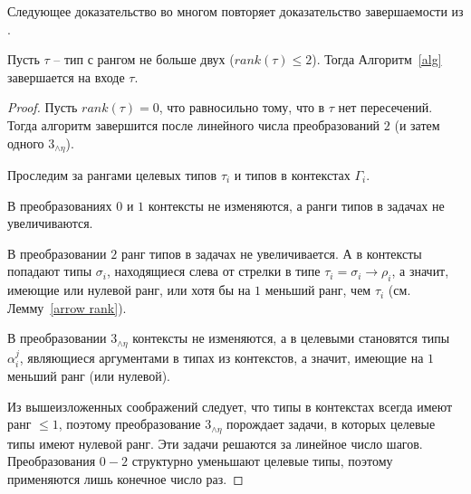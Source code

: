 \documentclass[../main.tex]{subfiles}
\begin{document}
Следующее доказательство во многом повторяет доказательство завершаемости из \cite{kusmierek_07}.
\begin{theorem}[Termination]
Пусть $\tau$ -- тип с рангом не больше двух ($rank(\tau) \leqslant 2$). Тогда Алгоритм~\ref{alg} завершается на входе $\tau$.
\end{theorem}
\begin{proof}
    Пусть $rank(\tau) = 0$, что равносильно тому, что в $\tau$ нет пересечений. Тогда алгоритм завершится после линейного числа преобразований $2$ (и затем одного $3_{\wedge \eta}$).
    
    Проследим за рангами целевых типов $\tau_i$ и типов в контекстах $\Gamma_i$.
    
    В преобразованиях $0$ и $1$ контексты не изменяются, а ранги типов в задачах не увеличиваются.
    
    В преобразовании $2$ ранг типов в задачах не увеличивается. А в контексты попадают 
    типы $\sigma_i$, находящиеся слева от стрелки в типе $\tau_i = \sigma_i \to \rho_i$, а значит, имеющие или нулевой ранг, или хотя бы на $1$ меньший ранг, чем $\tau_i$ (см. Лемму~\ref{arrow rank}). 
    
    В преобразовании $3_{\wedge \eta}$ контексты не изменяются, а в целевыми становятся типы $\alpha_i^j$, являющиеся аргументами в типах из контекстов, а значит, имеющие на $1$ меньший ранг (или нулевой).
    
    Из вышеизложенных соображений следует, что типы в контекстах всегда имеют ранг $\leqslant 1$, поэтому преобразование $3_{\wedge \eta}$ порождает задачи, в которых целевые типы имеют нулевой ранг. Эти задачи решаются за линейное число шагов. 
    Преобразования $0-2$ структурно уменьшают целевые типы, поэтому применяются лишь конечное число раз.
    
    
\end{proof}
\end{document}
